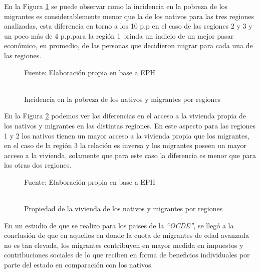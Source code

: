 \documentclass[12pt,a4paper]{article}
\begin{document}
En la Figura \ref{figure:pobre_mig} se puede observar como la incidencia en la pobreza de los migrantes es considerablemente menor que la de los nativos para las tres regiones analizadas, esta diferencia en torno a los 10 p.p en el caso de las regiones 2 y 3 y un poco más de 4 p.p.para la región 1 brinda un indicio de un mejor pasar económico, en promedio, de las personas que decidieron migrar para cada una de las regiones.


\begin{figure}[hb!]
\begin{center}
\caption{\\Incidencia en la pobreza de los nativos y migrantes por regiones}
\label{figure:pobre_mig}
 
\end{center}
\begin{flushleft}
\begin{scriptsize}
Fuente: Elaboración propia en base a EPH
\end{scriptsize}
\end{flushleft}
\end{figure}

En la Figura \ref{figure:vivienda_mig} podemos ver las diferencias en el acceso a la vivienda propia de los nativos y migrantes  en las distintas regiones. En este aspecto para las regiones 1 y 2 los nativos tienen un mayor acceso a la vivienda propia que los migrantes, en el caso de la región 3 la relación es inversa y los migrantes poseen un mayor acceso a la vivienda, solamente que para este caso la diferencia es menor que para las otras dos regiones.

\begin{figure}[ht!]
\begin{center}
\caption{\\Propiedad de la vivienda de los nativos y migrantes por regiones}
\label{figure:vivienda_mig}
 
\end{center}
\begin{flushleft}
\begin{scriptsize}
Fuente: Elaboración propia en base a EPH
\end{scriptsize}
\end{flushleft}
\end{figure}

En un estudio de \textcite{liebig_fiscal_2013} que se realizo para los paises de la \textit{``OCDE''}, se llegó a la conclusión de que en aquellos en donde la cuota de migrantes de edad avanzada no es tan elevada, los migrantes contribuyen en mayor medida en impuestos y contribuciones sociales de lo que reciben en forma de beneficios individuales por parte del estado en comparación con los nativos. 
\end{document}
